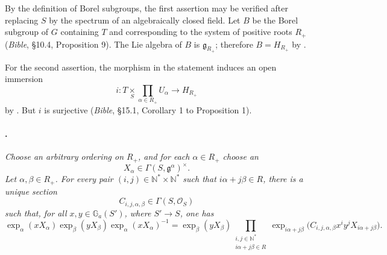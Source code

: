 By the definition of Borel subgroups, the first assertion may be
verified after replacing \(S\) by the spectrum of an algebraically
closed field. Let \(B\) be the Borel subgroup of \(G\) containing
\(T\) and corresponding to the system of positive roots \(R_+\)
\textup{(\emph{Bible}, \S10.4, Proposition 9)}. The Lie algebra of
\(B\) is \(\mathfrak g_{R_+}\); therefore \(B=H_{R_+}\) by .

For the second assertion, the morphism in the statement induces an
open immersion
\[
  i:
  T\mathop{\times}\limits_S
  \prod_{\alpha\in R_+}U_\alpha
  \longrightarrow H_{R_+}
\]
by . But \(i\) is surjective
\textup{(\emph{Bible}, \S15.1, Corollary 1 to Proposition 1)}.

\paragraph{.}
\textit{Choose an arbitrary ordering on \(R_+\), and for each
\(\alpha\in R_+\) choose an}
\[
  X_\alpha\in\Gamma(S,\mathfrak g^\alpha)^\times.
\]
\textit{Let \(\alpha,\beta\in R_+\). For every pair
\((i,j)\in\mathbb N^*\times\mathbb N^*\) such that
\(i\alpha+j\beta\in R\), there is a unique section}
\[
  C_{i,j,\alpha,\beta}\in\Gamma(S,\mathcal O_S)
\]
\textit{such that, for all \(x,y\in\mathbb G_a(S')\), where
\(S'\to S\), one has}
\[
  \exp_\alpha(xX_\alpha)
  \exp_\beta(yX_\beta)
  \exp_\alpha(xX_\alpha)^{-1}
  =
  \exp_\beta(yX_\beta)
  \prod_{\substack{i,j\in\mathbb N^*\\ i\alpha+j\beta\in R}}
    \exp_{i\alpha+j\beta}
      \bigl(C_{i,j,\alpha,\beta}x^iy^jX_{i\alpha+j\beta}\bigr).
\]

